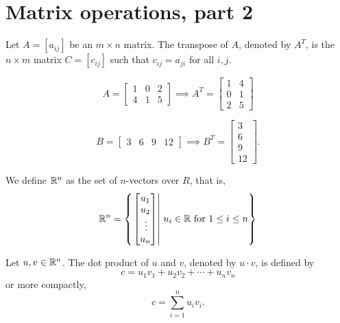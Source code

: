 \section{Matrix operations, part 2}
    \renewcommand{\leftmark}{August 14, 2023}

    \begin{dfn}[Transpose]
        Let \(A = [a_{ij}]\) be an \(m \times n\) matrix. The transpose of \(A\), denoted by \(A^{T}\), is the \(n \times m\) matrix \(C = [c_{ij}]\) such that \(c_{ij} = a_{ji}\) for all \(i, j\).
    \end{dfn}

    \begin{example}
        \[A = \begin{bmatrix}
            1 & 0 & 2 \\ 4 & 1 & 5
        \end{bmatrix} \implies A^T = \begin{bmatrix}
            1 & 4 \\ 0 & 1 \\ 2 & 5
        \end{bmatrix}\]

        \[B = \begin{bmatrix}
            3 & 6 & 9 & 12
        \end{bmatrix} \implies B^T = \begin{bmatrix}
            3 \\ 6 \\ 9 \\ 12
        \end{bmatrix}.\]
    \end{example}

    \begin{dfn}
        We define \(\mathbb{R}^n\) as the set of \(n\)-vectors over \(R\), that is, \[\mathbb{R}^n = \left\{\left.\begin{bmatrix}
            u_1 \\ u_2 \\ \,\vdots \\ u_n
        \end{bmatrix}\right| \,u_i \in\mathbb{R} \text{ for } 1 \leq i \leq n\right\}\]
    \end{dfn}

    \begin{dfn}
        Let \(u,v\in\mathbb{R}^n\). The dot product of \(u\) and \(v\), denoted by \(u \cdot v\), is defined by \[c = u_1v_1 + u_2v_2 + \cdots + u_nv_n\] or more compactly, \[c = \sum_{i = 1}^n u_iv_i.\]
    \end{dfn}

